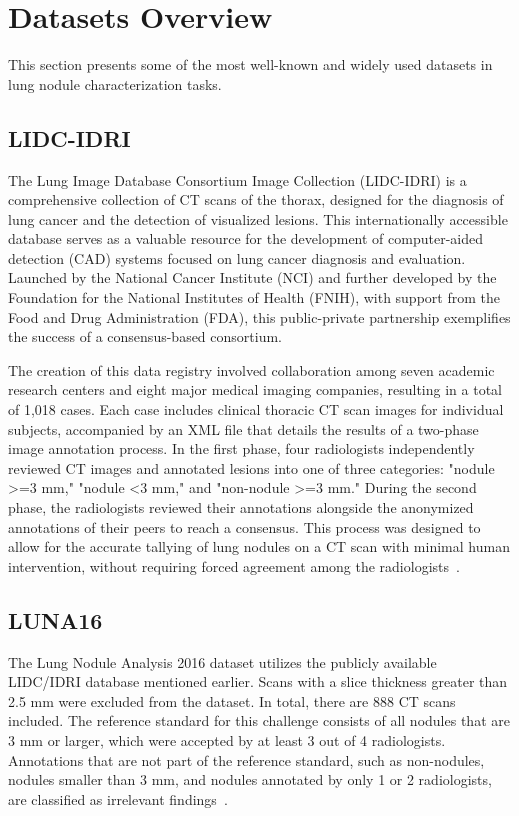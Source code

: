 \section{Datasets Overview}
This section presents some of the most well-known and widely used datasets in lung nodule characterization tasks.

\subsection{LIDC-IDRI }
The Lung Image Database Consortium Image Collection (LIDC-IDRI) is a comprehensive collection of CT scans of the thorax, designed for the diagnosis of lung cancer and the detection of visualized lesions. This internationally accessible database serves as a valuable resource for the development of computer-aided detection (CAD) systems focused on lung cancer diagnosis and evaluation. Launched by the National Cancer Institute (NCI) and further developed by the Foundation for the National Institutes of Health (FNIH), with support from the Food and Drug Administration (FDA), this public-private partnership exemplifies the success of a consensus-based consortium.

The creation of this data registry involved collaboration among seven academic research centers and eight major medical imaging companies, resulting in a total of 1,018 cases. Each case includes clinical thoracic CT scan images for individual subjects, accompanied by an XML file that details the results of a two-phase image annotation process. In the first phase, four radiologists independently reviewed CT images and annotated lesions into one of three categories: "nodule >=3 mm," "nodule <3 mm," and "non-nodule >=3 mm." During the second phase, the radiologists reviewed their annotations alongside the anonymized annotations of their peers to reach a consensus. This process was designed to allow for the accurate tallying of lung nodules on a CT scan with minimal human intervention, without requiring forced agreement among the radiologists~\cite{Armato2015}.

\subsection{LUNA16}
The Lung Nodule Analysis 2016 dataset utilizes the publicly available LIDC/IDRI database mentioned earlier. Scans with a slice thickness greater than 2.5 mm were excluded from the dataset. In total, there are 888 CT scans included. The reference standard for this challenge consists of all nodules that are 3 mm or larger, which were accepted by at least 3 out of 4 radiologists. Annotations that are not part of the reference standard, such as non-nodules, nodules smaller than 3 mm, and nodules annotated by only 1 or 2 radiologists, are classified as irrelevant findings~\cite{LUNA16}.


